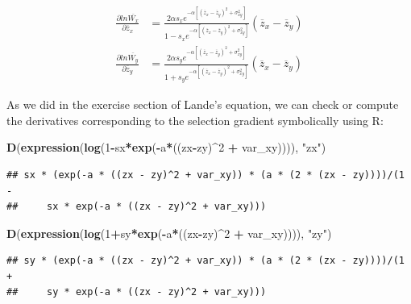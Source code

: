 \documentclass[
]{book}
\newenvironment{Shaded}{\begin{snugshade}}{\end{snugshade}}
\newcommand{\DecValTok}[1]{\textcolor[rgb]{0.00,0.00,0.81}{#1}}
\newcommand{\FunctionTok}[1]{\textcolor[rgb]{0.13,0.29,0.53}{\textbf{#1}}}
\newcommand{\NormalTok}[1]{#1}
\newcommand{\SpecialCharTok}[1]{\textcolor[rgb]{0.81,0.36,0.00}{\textbf{#1}}}
\newcommand{\StringTok}[1]{\textcolor[rgb]{0.31,0.60,0.02}{#1}}
\begin{document}
\[\begin{aligned}
\frac{\partial ln\overline{W_x}}{\partial \overline{z}_x} &= \frac{2\alpha s_{x}e^{-\alpha[(\overline{z}_x-\overline{z}_y)^2+\sigma^2_{xy}]}}{1-s_{x}e^{-\alpha[(\overline{z}_x-\overline{z}_y)^2+\sigma^2_{xy}]}}(\overline{z}_x-\overline{z}_y) \\
\frac{\partial ln\overline{W_y}}{\partial \overline{z}_y} &= \frac{2\alpha s_{y}e^{-\alpha[(\overline{z}_x-\overline{z}_y)^2+\sigma^2_{xy}]}}{1+s_{y}e^{-\alpha[(\overline{z}_x-\overline{z}_y)^2+\sigma^2_{xy}]}}(\overline{z}_x-\overline{z}_y)
\end{aligned}\]

As we did in the exercise section of Lande's equation, we can check or compute the derivatives corresponding to the selection gradient symbolically using R:

\begin{Shaded}
\begin{Highlighting}[]
\FunctionTok{D}\NormalTok{(}\FunctionTok{expression}\NormalTok{(}\FunctionTok{log}\NormalTok{(}\DecValTok{1}\SpecialCharTok{{-}}\NormalTok{sx}\SpecialCharTok{*}\FunctionTok{exp}\NormalTok{(}\SpecialCharTok{{-}}\NormalTok{a}\SpecialCharTok{*}\NormalTok{((zx}\SpecialCharTok{{-}}\NormalTok{zy)}\SpecialCharTok{\^{}}\DecValTok{2} \SpecialCharTok{+}\NormalTok{ var\_xy)))), }\StringTok{"zx"}\NormalTok{)}
\end{Highlighting}
\end{Shaded}

\begin{verbatim}
## sx * (exp(-a * ((zx - zy)^2 + var_xy)) * (a * (2 * (zx - zy))))/(1 - 
##     sx * exp(-a * ((zx - zy)^2 + var_xy)))
\end{verbatim}

\begin{Shaded}
\begin{Highlighting}[]
\FunctionTok{D}\NormalTok{(}\FunctionTok{expression}\NormalTok{(}\FunctionTok{log}\NormalTok{(}\DecValTok{1}\SpecialCharTok{+}\NormalTok{sy}\SpecialCharTok{*}\FunctionTok{exp}\NormalTok{(}\SpecialCharTok{{-}}\NormalTok{a}\SpecialCharTok{*}\NormalTok{((zx}\SpecialCharTok{{-}}\NormalTok{zy)}\SpecialCharTok{\^{}}\DecValTok{2} \SpecialCharTok{+}\NormalTok{ var\_xy)))), }\StringTok{"zy"}\NormalTok{)}
\end{Highlighting}
\end{Shaded}

\begin{verbatim}
## sy * (exp(-a * ((zx - zy)^2 + var_xy)) * (a * (2 * (zx - zy))))/(1 + 
##     sy * exp(-a * ((zx - zy)^2 + var_xy)))
\end{verbatim}
\end{document}
